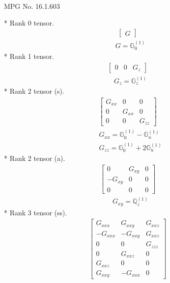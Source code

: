 \documentclass[fleqn,8pt,landscape]{jsarticle}
\begin{document}
\setcounter{MaxMatrixCols}{32}

\renewcommand{\tablename}{Table~}
\renewcommand{\figurename}{Figure~}
\begin{center}
\LARGE
MPG No. 16.1.60\quad$3$
\end{center}
* Rank 0 tensor.
\begin{align*}
\begin{bmatrix} G \end{bmatrix}
\end{align*}
\begin{align*}
& G = \mathbb{G}_{0}^{(1)}
\end{align*}
* Rank 1 tensor.
\begin{align*}
\begin{bmatrix} 0 & 0 & G_{z} \end{bmatrix}
\end{align*}
\begin{align*}
& G_{z} = \mathbb{G}_{z}^{(1)}
\end{align*}
* Rank 2 tensor (s).
\begin{align*}
\begin{bmatrix} G_{xx} & 0 & 0 \\ 0 & G_{xx} & 0 \\ 0 & 0 & G_{zz} \end{bmatrix}
\end{align*}
\begin{align*}
& G_{xx} = \mathbb{G}_{0}^{(1)} - \mathbb{G}_{u}^{(1)} \\
& G_{zz} = \mathbb{G}_{0}^{(1)} + 2 \mathbb{G}_{u}^{(1)}
\end{align*}
* Rank 2 tensor (a).
\begin{align*}
\begin{bmatrix} 0 & G_{xy} & 0 \\ - G_{xy} & 0 & 0 \\ 0 & 0 & 0 \end{bmatrix}
\end{align*}
\begin{align*}
& G_{xy} = \mathbb{Q}_{z}^{(1)}
\end{align*}
* Rank 3 tensor (ss).
\begin{align*}
\begin{bmatrix} G_{xxx} & G_{xxy} & G_{xxz} \\ - G_{xxx} & - G_{xxy} & G_{xxz} \\ 0 & 0 & G_{zzz} \\ 0 & G_{xxz} & 0 \\ G_{xxz} & 0 & 0 \\ G_{xxy} & - G_{xxx} & 0 \end{bmatrix}
\end{align*}
\end{document}
